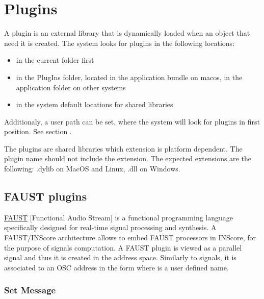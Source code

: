 \documentclass[a4paper,twoside]{report}
\newcommand{\toplevel}[1]	{\chapter{#1}}
\newcommand{\sublevel}[1]	{\section{#1}}
\newcommand{\subsublevel}[1]	{\subsection{#1}}
\begin{document}
\toplevel{Plugins}
\label{plugins}

A plugin is an external library that is dynamically loaded when an object that need it is created.
The system looks for plugins in the following locations:
\begin{itemize}
\item in the current folder first
\item in the PlugIns folder, located in the application bundle on macos, in the application folder on other systems
\item in the system default locations for shared libraries
\end{itemize}
Additionaly, a user path can be set, where the system will look for plugins in first position. See section .

The plugins are shared libraries which extension is platform dependent. The plugin name should not include the extension. The expected extensions are the following: .dylib on MacOS and Linux, .dll on Windows.



\sublevel{FAUST plugins}
\label{faust}

\href{http://faust.grame.fr}{FAUST} [Functional Audio Stream] is a functional programming language specifically designed for real-time signal processing and synthesis. A FAUST/INScore architecture allows to embed FAUST processors in INScore, for the purpose of signals computation. A FAUST plugin is viewed as a parallel signal and thus it is created in the  address space. Similarly to signals, it is associated to an OSC address in the form  where  is a user defined name.

\subsublevel{Set Message}
\label{faustsetmsg}
\end{document}
